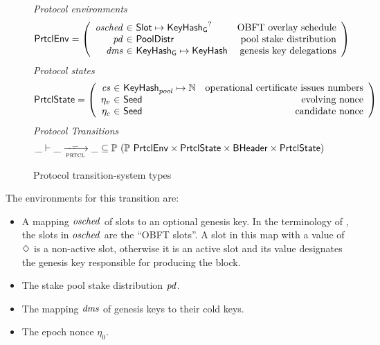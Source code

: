 \begin{figure}
  \emph{Protocol environments}
  \begin{equation*}
    \PrtclEnv =
    \left(
      \begin{array}{r@{~\in~}lr}
        \var{osched} & \Slot\mapsto\KeyHashGen^? & \text{OBFT overlay schedule} \\
        \var{pd} & \PoolDistr & \text{pool stake distribution} \\
        \var{dms} & \KeyHashGen\mapsto\KeyHash & \text{genesis key delegations} \\
      \end{array}
    \right)
  \end{equation*}
  \emph{Protocol states}
  \begin{equation*}
    \PrtclState =
    \left(
      \begin{array}{r@{~\in~}lr}
        \var{cs} & \KeyHash_{pool} \mapsto \N & \text{operational certificate issues numbers} \\
        \eta_v & \Seed & \text{evolving nonce} \\
        \eta_c & \Seed & \text{candidate nonce} \\
      \end{array}
    \right)
  \end{equation*}
  \emph{Protocol Transitions}
  \begin{equation*}
    \_ \vdash \var{\_} \trans{prtcl}{\_} \var{\_} \subseteq
    \powerset (\powerset{\PrtclEnv} \times \PrtclState \times \BHeader \times \PrtclState)
  \end{equation*}
  \caption{Protocol transition-system types}
  \label{fig:ts-types:prtcl}
\end{figure}

The environments for this transition are:
\begin{itemize}
  \item A mapping $\mathit{osched}$ of slots to an optional genesis key.
    In the terminology of \cite{delegation_design},
    the slots in $\mathit{osched}$ are the ``OBFT slots''.
    A slot in this map with a value of $\Diamond$ is a non-active slot,
    otherwise it is an active slot and its value designates the genesis key
    responsible for producing the block.
  \item The stake pool stake distribution $\mathit{pd}$.
  \item The mapping $\mathit{dms}$ of genesis keys to their cold keys.
  \item The epoch nonce $\eta_0$.
\end{itemize}

